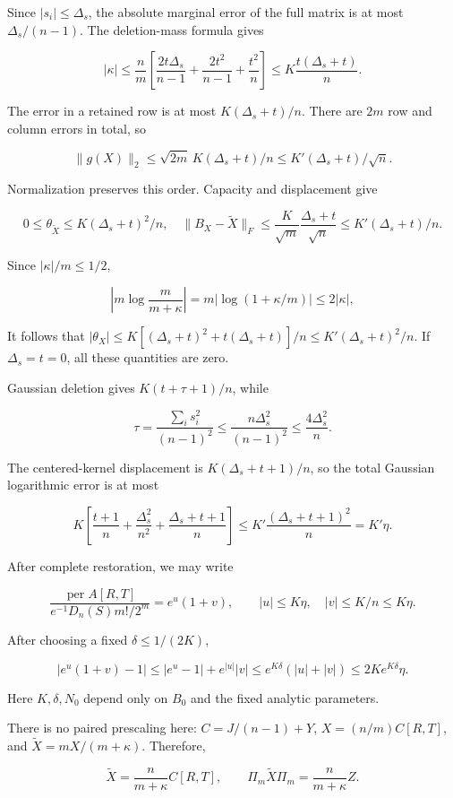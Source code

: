 \documentclass[11pt,a4paper]{article}
\begin{document}
Since \(|s_i|\le \Delta_s\), the absolute marginal error of the full matrix is at most \(\Delta_s/(n-1)\). The deletion-mass formula gives

\[
|\kappa|\le\frac nm\left[\frac{2t\Delta_s}{n-1}+\frac{2t^2}{n-1}+\frac{t^2}n\right]
\le K\frac{t(\Delta_s+t)}n.
\]

The error in a retained row is at most \(K(\Delta_s+t)/n\). There are \(2m\) row and column errors in total, so

\[
\|g(X)\|_2\le\sqrt{2m}\,K(\Delta_s+t)/n
\le K'(\Delta_s+t)/\sqrt n.
\]

Normalization preserves this order. Capacity and displacement give

\[
0\le\theta_{\widetilde X}\le K(\Delta_s+t)^2/n,
\quad
\|B_X-\widetilde X\|_F\le\frac K{\sqrt m}\frac{\Delta_s+t}{\sqrt n}
\le K'(\Delta_s+t)/n.
\]

Since \(|\kappa|/m\le1/2\),

\[
\left|m\log\frac m{m+\kappa}\right|
=m|\log(1+\kappa/m)|\le2|\kappa|,
\]

It follows that \(|\theta_X|\le K[(\Delta_s+t)^2+t(\Delta_s+t)]/n\le K'(\Delta_s+t)^2/n\). If \(\Delta_s=t=0\), all these quantities are zero.

Gaussian deletion gives \(K(t+\tau+1)/n\), while

\[
\tau=\frac{\sum_i s_i^2}{(n-1)^2}\le\frac{n\Delta_s^2}{(n-1)^2}\le\frac{4\Delta_s^2}n.
\]

The centered-kernel displacement is \(K(\Delta_s+t+1)/n\), so the total Gaussian logarithmic error is at most

\[
K\left[\frac{t+1}n+\frac{\Delta_s^2}{n^2}+\frac{\Delta_s+t+1}n\right]
\le K'\frac{(\Delta_s+t+1)^2}n=K'\eta.
\]

After complete restoration, we may write

\[
\frac{\operatorname{per}A[R,T]}{e^{-1}D_n(S)m!/2^m}
=e^u(1+v),\qquad |u|\le K\eta,\quad |v|\le K/n\le K\eta.
\]

After choosing a fixed \(\delta\le1/(2K)\),

\[
|e^u(1+v)-1|
\le|e^u-1|+e^{|u|}|v|
\le e^{K\delta}(|u|+|v|)
\le2Ke^{K\delta}\eta.
\]

Here \(K,\delta,N_0\) depend only on \(B_0\) and the fixed analytic parameters.

There is no paired prescaling here: \(C=J/(n-1)+Y\), \(X=(n/m)C[R,T]\), and \(\widetilde X=mX/(m+\kappa)\). Therefore,

\[
\widetilde X=\frac n{m+\kappa}C[R,T],\qquad
\Pi_m\widetilde X\Pi_m=\frac n{m+\kappa}Z.
\]
\end{document}
